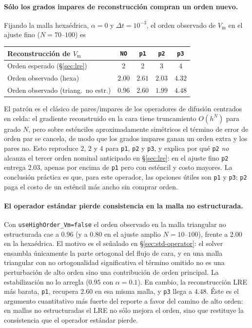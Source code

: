 \documentclass[11pt,a4paper]{article}
\newcommand{\code}[1]{\texttt{\small #1}}
\newcommand{\Vm}{V_{\text{m}}}
\begin{document}
\paragraph{Sólo los grados impares de reconstrucción compran un orden nuevo.}
Fijando la malla hexaédrica, $\alpha=0$ y $\Delta t=10^{-3}$, el orden observado de $\Vm$ en el
ajuste fino ($N=70$--$100$) es
\begin{center}
\begin{tabular}{@{}lcccc@{}}
\toprule
Reconstrucción de $\Vm$ & \code{NO} & \code{p1} & \code{p2} & \code{p3} \\
\midrule
Orden esperado (\S\ref{sec:lre}) & 2 & 2 & 3 & 4 \\
Orden observado (hexa) & $2.00$ & $2.61$ & $2.03$ & $4.32$ \\
Orden observado (triang.\ no estr.) & $0.96$ & $2.60$ & $1.99$ & $4.48$ \\
\bottomrule
\end{tabular}
\end{center}
El patrón es el clásico de pares/impares de los operadores de difusión centrados en celda: el
gradiente reconstruido en la cara tiene truncamiento $O(h^{N})$ para grado $N$, pero sobre
esténciles aproximadamente simétricos el término de error de orden par se cancela, de modo que
los grados impares ganan un orden extra y los pares no. Esto reproduce $2$, $2$ y $4$ para
\code{p1}, \code{p2} y \code{p3}, y explica por qué \code{p2} \emph{no} alcanza el tercer orden
nominal anticipado en \S\ref{sec:lre}: en el ajuste fino \code{p2} entrega $2.03$, apenas por
encima de \code{p1} pero con esténcil y costo mayores. La conclusión práctica es que, para este
operador, las opciones útiles son \code{p1} y \code{p3}; \code{p2} paga el costo de un esténcil
más ancho sin comprar orden.

\paragraph{El operador estándar pierde consistencia en la malla no estructurada.}
Con \code{useHighOrder\_Vm=false} el orden observado en la malla triangular no estructurada cae
a $0.96$ (y a $0.80$ en el ajuste amplio $N=10$--$100$), frente a $2.00$ en la hexaédrica. El
motivo es el señalado en \S\ref{sec:std-operator}: el solver ensambla únicamente la parte
ortogonal del flujo de cara, y en una malla triangular con no ortogonalidad significativa el
término omitido no es una perturbación de alto orden sino una contribución de orden principal.
La estabilización no lo arregla ($0.95$ con $\alpha=0.1$). En cambio, la reconstrucción LRE
más barata, \code{p1}, recupera $2.60$ en esa misma malla, y \code{p3} llega a $4.48$. Éste es
el argumento cuantitativo más fuerte del reporte a favor del camino de alto orden: en mallas no
estructuradas el LRE no sólo mejora el orden, sino que restituye la consistencia que el
operador estándar pierde.
\end{document}
